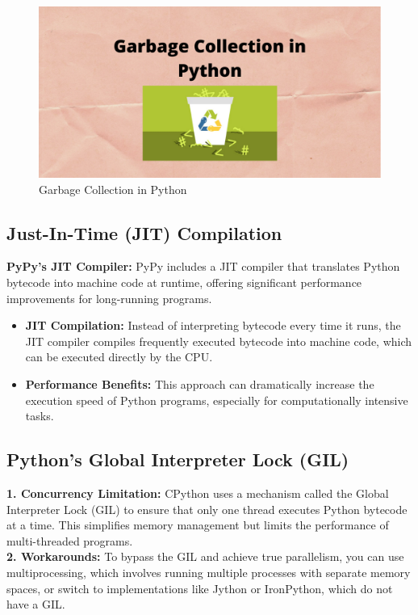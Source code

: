 \documentclass[12pt]{article}
\begin{document}
\begin{figure}[h!]
\begin{center}
\includegraphics[width=12.5cm]{mechanism2.png}\\
Garbage Collection in Python
\end{center}
\end{figure}


\subsection{Just-In-Time (JIT) Compilation}

\textbf{PyPy's JIT Compiler:} PyPy includes a JIT compiler that translates Python bytecode into machine code at runtime, offering significant performance improvements for long-running programs.
\begin{itemize}
    \item \textbf{JIT Compilation:} Instead of interpreting bytecode every time it runs, the JIT compiler compiles frequently executed bytecode into machine code, which can be executed directly by the CPU.
    \item \textbf{Performance Benefits:} This approach can dramatically increase the execution speed of Python programs, especially for computationally intensive tasks.
\end{itemize}

\subsection{Python's Global Interpreter Lock (GIL)}
\textbf{1. Concurrency Limitation:} CPython uses a mechanism called the Global Interpreter Lock (GIL) to ensure that only one thread executes Python bytecode at a time. This simplifies memory management but limits the performance of multi-threaded programs.\\

\textbf{2. Workarounds:} To bypass the GIL and achieve true parallelism, you can use multiprocessing, which involves running multiple processes with separate memory spaces, or switch to implementations like Jython or IronPython, which do not have a GIL.\\
\end{document}
